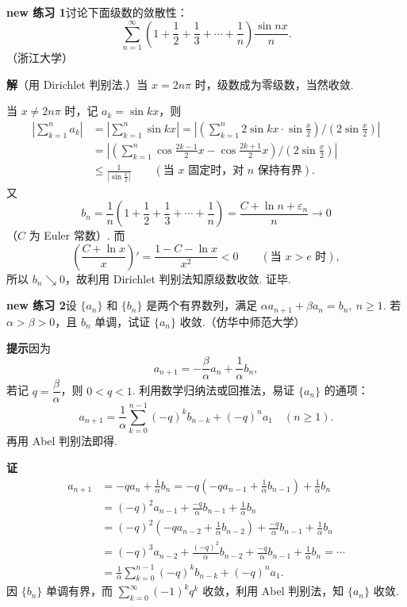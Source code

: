 \documentclass[UTF8,12pt,a4paper,fontset=fandol]{ctexart}
\begin{document}
\noindent\textbf{new 练习 1}\quad 讨论下面级数的敛散性：
\[
  \sum_{n=1}^{\infty}\left(1+\frac12+\frac13+\cdots+\frac1n\right)\frac{\sin nx}{n}.
\]
（浙江大学）

\noindent\textbf{解}\quad （用 Dirichlet 判别法.）当 $x=2n\pi$ 时，级数成为零级数，当然收敛.

当 $x\ne2n\pi$ 时，记 $a_k=\sin kx$，则
\[
\begin{aligned}
  \left|\sum_{k=1}^n a_k\right|
  &=\left|\sum_{k=1}^n\sin kx\right|
   =\left|\left(\sum_{k=1}^n2\sin kx\cdot\sin\frac x2\right)\bigg/\left(2\sin\frac x2\right)\right|\\
  &=\left|\left(\sum_{k=1}^n\cos\frac{2k-1}{2}x-\cos\frac{2k+1}{2}x\right)\bigg/\left(2\sin\frac x2\right)\right|\\
  &\le\frac1{\left|\sin\frac x2\right|}
  \qquad(\text{当 }x\text{ 固定时，对 }n\text{ 保持有界}).
\end{aligned}
\]
又
\[
  b_n=\frac1n\left(1+\frac12+\frac13+\cdots+\frac1n\right)
  =\frac{C+\ln n+\varepsilon_n}{n}\to0
\]
（$C$ 为 Euler 常数）. 而
\[
  \left(\frac{C+\ln x}{x}\right)'=\frac{1-C-\ln x}{x^2}<0
  \qquad(\text{当 }x>e\text{ 时}),
\]
所以 $b_n\searrow0$，故利用 Dirichlet 判别法知原级数收敛. 证毕.

\noindent\textbf{new 练习 2}\quad 设 $\{a_n\}$ 和 $\{b_n\}$ 是两个有界数列，满足
$\alpha a_{n+1}+\beta a_n=b_n,\ n\ge1$. 若 $\alpha>\beta>0$，且 $b_n$ 单调，试证 $\{a_n\}$ 收敛.（仿华中师范大学）

\noindent\textbf{提示}\quad 因为
\[
  a_{n+1}=-\frac{\beta}{\alpha}a_n+\frac1\alpha b_n,
\]
若记 $q=\dfrac{\beta}{\alpha}$，则 $0<q<1$. 利用数学归纳法或回推法，易证 $\{a_n\}$ 的通项：
\[
  a_{n+1}=\frac1\alpha\sum_{k=0}^{n-1}(-q)^k b_{n-k}+(-q)^n a_1\quad(n\ge1).
\]
再用 Abel 判别法即得.

\noindent\textbf{证}\quad
\[
\begin{aligned}
  a_{n+1}
  &=-qa_n+\frac1\alpha b_n
   =-q\left(-qa_{n-1}+\frac1\alpha b_{n-1}\right)+\frac1\alpha b_n\\
  &=(-q)^2a_{n-1}+\frac{-q}{\alpha}b_{n-1}+\frac1\alpha b_n\\
  &=(-q)^2\left(-qa_{n-2}+\frac1\alpha b_{n-2}\right)
    +\frac{-q}{\alpha}b_{n-1}+\frac1\alpha b_n\\
  &=(-q)^3a_{n-2}+\frac{(-q)^2}{\alpha}b_{n-2}
    +\frac{-q}{\alpha}b_{n-1}+\frac1\alpha b_n=\cdots\\
  &=\frac1\alpha\sum_{k=0}^{n-1}(-q)^k b_{n-k}+(-q)^n a_1.
\end{aligned}
\]
因 $\{b_n\}$ 单调有界，而 $\displaystyle\sum_{k=0}^{\infty}(-1)^kq^k$ 收敛，利用 Abel 判别法，知 $\{a_n\}$ 收敛.
\end{document}
